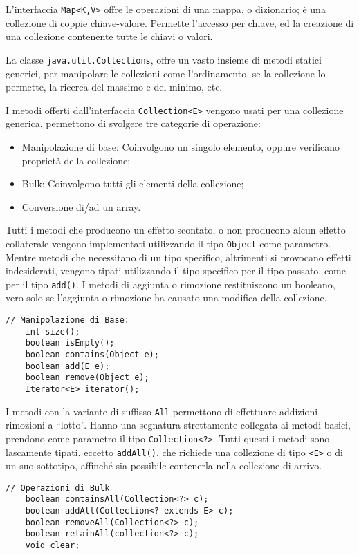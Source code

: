 \documentclass{article}
\numberwithin{equation}{subsection}
\begin{document}
L'interfaccia \verb|Map<K,V>| offre le operazioni di una mappa, o dizionario; è una collezione di coppie chiave-valore. Permette l'accesso per chiave, ed la creazione di una collezione 
contenente tutte le chiavi o valori. 


La classe \verb|java.util.Collections|, offre un vasto insieme di metodi statici generici, per manipolare le collezioni come l'ordinamento, se la collezione lo permette, la ricerca del massimo 
e del minimo, etc. 


I metodi offerti dall'interfaccia \verb|Collection<E>| vengono usati per una collezione generica, permettono di svolgere tre categorie di operazione:
\begin{itemize}
    \item Manipolazione di base: Coinvolgono un singolo elemento, oppure verificano proprietà della collezione;
    \item Bulk: Coinvolgono tutti gli elementi della collezione;
    \item Conversione di/ad un array. 
\end{itemize}

Tutti i metodi che producono un effetto scontato, o non producono alcun effetto collaterale vengono implementati utilizzando il tipo \verb|Object| come parametro. 
Mentre metodi che necessitano di un tipo specifico, altrimenti si provocano effetti indesiderati, vengono tipati utilizzando il tipo specifico per il tipo passato, come per il 
tipo \verb|add()|. I metodi di aggiunta o rimozione restituiscono un booleano, vero solo se l'aggiunta o rimozione ha causato una modifica della collezione.   
\begin{verbatim}
// Manipolazione di Base:
    int size();
    boolean isEmpty();
    boolean contains(Object e);
    boolean add(E e);
    boolean remove(Object e);
    Iterator<E> iterator();
\end{verbatim}

I metodi con la variante di suffisso \verb|All| permettono di effettuare addizioni rimozioni a ``lotto''. Hanno una segnatura strettamente collegata ai metodi basici, 
prendono come parametro il tipo \verb|Collection<?>|. Tutti questi i metodi sono lascamente tipati, eccetto \verb|addAll()|, che richiede una collezione di tipo \verb|<E>| o di 
un suo sottotipo, affinché sia possibile contenerla nella collezione di arrivo. 
\begin{verbatim}
// Operazioni di Bulk
    boolean containsAll(Collection<?> c);
    boolean addAll(Collection<? extends E> c);
    boolean removeAll(Collection<?> c);
    boolean retainAll(collection<?> c);
    void clear;
\end{verbatim}
\end{document}
